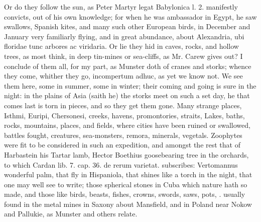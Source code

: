 {Or do they follow the sun, as Peter Martyr legat Babylonica l. 2.
manifestly convicts, out of his own knowledge; for when he was
ambassador in Egypt, he saw swallows, Spanish kites, and many
such other European birds, in December and January very familiarly
flying, and in great abundance, about Alexandria, ubi floridae tunc
arbores ac viridaria. Or lie they hid in caves, rocks, and hollow
trees, as most think, in deep tin-mines or sea-cliffs, as Mr.
Carew gives out? I conclude of them all, for my part, as Munster
doth of cranes and storks; whence they come, whither they go,
incompertum adhuc, as yet we know not. We see them here, some in
summer, some in winter; their coming and going is sure in the night: in
the plains of Asia (saith he) the storks meet on such a set day, he
that comes last is torn in pieces, and so they get them gone. Many
strange places, Isthmi, Euripi, Chersonesi, creeks, havens,
promontories, straits, Lakes, baths, rocks, mountains, places, and
fields, where cities have been ruined or swallowed, battles fought,
creatures, sea-monsters, remora, \etc{} minerals, vegetals. Zoophytes were
fit to be considered in such an expedition, and amongst the rest that
of Harbastein his Tartar lamb, Hector Boethius goosebearing
tree in the orchards, to which Cardan lib. 7. cap. 36. de rerum
varietat. subscribes: Vertomannus wonderful palm, that  fly
in Hispaniola, that shines like a torch in the night, that one may well
see to write; those spherical stones in Cuba which nature hath so made,
and those like birds, beasts, fishes, crowns, swords, saws, pots, \etc{}.
usually found in the metal mines in Saxony about Mansfield, and in
Poland near Nokow and Pallukie, as Munster and others relate.

}
